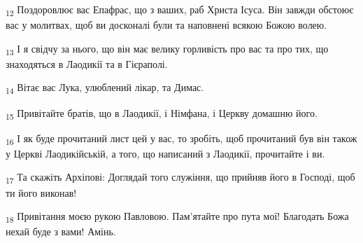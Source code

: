 \begin{tcolorbox}
\textsubscript{12} Поздоровлює вас Епафрас, що з ваших, раб Христа Ісуса. Він завжди обстоює вас у молитвах, щоб ви досконалі були та наповнені всякою Божою волею.
\end{tcolorbox}
\begin{tcolorbox}
\textsubscript{13} І я свідчу за нього, що він має велику горливість про вас та про тих, що знаходяться в Лаодикії та в Гієраполі.
\end{tcolorbox}
\begin{tcolorbox}
\textsubscript{14} Вітає вас Лука, улюблений лікар, та Димас.
\end{tcolorbox}
\begin{tcolorbox}
\textsubscript{15} Привітайте братів, що в Лаодикії, і Німфана, і Церкву домашню його.
\end{tcolorbox}
\begin{tcolorbox}
\textsubscript{16} І як буде прочитаний лист цей у вас, то зробіть, щоб прочитаний був він також у Церкві Лаодикійській, а того, що написаний з Лаодикії, прочитайте і ви.
\end{tcolorbox}
\begin{tcolorbox}
\textsubscript{17} Та скажіть Архіпові: Доглядай того служіння, що прийняв його в Господі, щоб ти його виконав!
\end{tcolorbox}
\begin{tcolorbox}
\textsubscript{18} Привітання моєю рукою Павловою. Пам'ятайте про пута мої! Благодать Божа нехай буде з вами! Амінь.
\end{tcolorbox}
